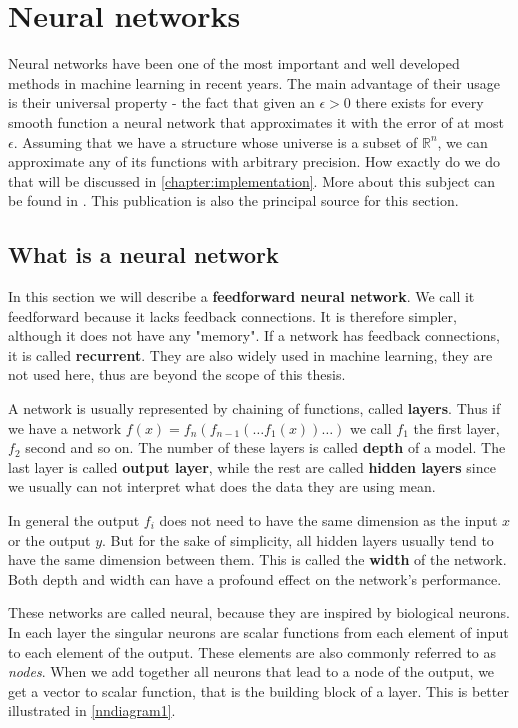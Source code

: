 \section{Neural networks}
Neural networks have been one of the most important and well developed methods in machine learning in recent years. The main advantage of their usage is their universal property - the fact that given an $\epsilon>0$ there exists for every smooth function a neural network that approximates it with the error of at most $\epsilon$. Assuming that we have a structure whose universe is a subset of $\mathbb{R}^n$, we can approximate any of its functions with arbitrary precision. How exactly do we do that will be discussed in \autoref{chapter:implementation}. More about this subject can be found in \cite{neural}. This publication is also the principal source for this section.

\subsection{What is a neural network}
In this section we will describe a \textbf{feedforward neural network}. We call it feedforward because it lacks feedback connections. It is therefore simpler, although it does not have any "memory". If a network has feedback connections, it is called \textbf{recurrent}. They are also widely used in machine learning, they are not used here, thus are beyond the scope of this thesis.

A network is usually represented by chaining of functions, called \textbf{layers}. Thus if we have a network $f(x)=f_n(f_{n-1}(\dots f_1(x))\dots)$ we call $f_1$ the first layer, $f_2$ second and so on. The number of these layers is called \textbf{depth} of a model. The last layer is called \textbf{output layer}, while the rest are called \textbf{hidden layers} since we usually can not interpret what does the data they are using mean.

In general the output $f_i$ does not need to have the same dimension as the input $x$ or the output $y$. But for the sake of simplicity, all hidden layers usually tend to have the same dimension between them. This is called the \textbf{width} of the network. Both depth and width can have a profound effect on the network's performance. 

These networks are called neural, because they are inspired by biological neurons. In each layer the singular neurons are scalar functions from each element of input to each element of the output. These elements are also commonly referred to as \textit{nodes}. When we add together all neurons that lead to a node of the output, we get a vector to scalar function, that is the building block of a layer. This is better illustrated in \autoref{nndiagram1}.

